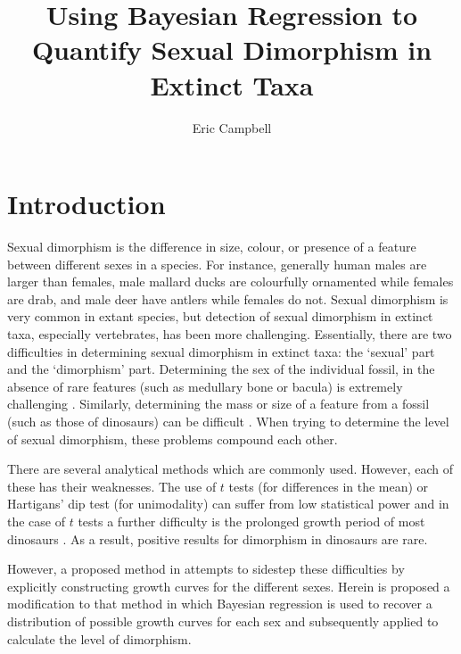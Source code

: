 \documentclass[letterpaper]{article}
\title{Using Bayesian Regression to Quantify Sexual Dimorphism in Extinct Taxa}
\author{Eric Campbell}
\begin{document}
\maketitle

\newcommand{\species}[1]{\textit{#1}}
\newcommand{\tyran}{\species{Tyrannosaurus rex}{}}
\newcommand{\psit}{\species{Psittacosurus lujiatunensis}{}}
\newcommand{\maia}{\species{Maiasaura peeblesorum}{}}
\newcommand{\normal}[2]{\ensuremath{\mathcal{N}\left(#1, #2\right)}}

\section{Introduction}
Sexual dimorphism is the difference in size, colour, or presence of a feature between different sexes in a species. For instance, generally human males are larger than females, male mallard ducks are colourfully ornamented while females are drab, and male deer have antlers while females do not. Sexual dimorphism is very common in extant species, but detection of sexual dimorphism in extinct taxa, especially vertebrates, has been more challenging. Essentially, there are two difficulties in determining sexual dimorphism in extinct taxa: the `sexual' part and the `dimorphism' part. Determining the sex of the individual fossil, in the absence of rare features (such as medullary bone or bacula) is extremely challenging \parencite{saittaEffectSizeStatistical2020}. Similarly, determining the mass or size of a feature from a fossil (such as those of dinosaurs) can be difficult \parencite[p.~126]{brusatte2012}. When trying to determine the level of sexual dimorphism, these problems compound each other.

There are several analytical methods which are commonly used. However, each of these has their weaknesses. The use of $t$ tests (for differences in the mean) or Hartigans' dip test (for unimodality) can suffer from low statistical power \parencite{mallonRecognizingSexualDimorphism2017} and in the case of $t$ tests a further difficulty is the prolonged growth period of most dinosaurs \parencite{honeProtractedGrowthImpedes2017}. As a result, positive results for dimorphism in dinosaurs are rare.

However, a proposed method in \cite{saittaEffectSizeStatistical2020} attempts to sidestep these difficulties by explicitly constructing growth curves for the different sexes. Herein is proposed a modification to that method in which Bayesian regression is used to recover a distribution of possible growth curves for each sex and subsequently applied to calculate the level of dimorphism.
\end{document}
